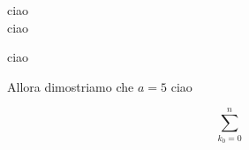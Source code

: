





\Large



\begin{multicols}{4}
ciao \\ ciao

ciao

Allora dimostriamo che $ a = 5  $ ciao

\begin{equation}
    \sum_{k_0=0}^n
\end{equation}


\end{multicols}





